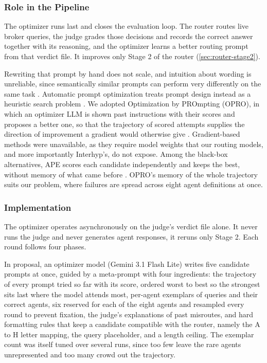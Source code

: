 \label{sec:optimizer}

\subsubsection{Role in the Pipeline}\label{sec:optimizer-role}

The optimizer runs last and closes the evaluation loop. The router routes live broker queries, the judge grades those decisions and records the correct answer together with its reasoning, and the optimizer learns a better routing prompt from that verdict file. It improves only Stage 2 of the router (\cref{sec:router-stage2}).

Rewriting that prompt by hand does not scale, and intuition about wording is unreliable, since semantically similar prompts can perform very differently on the same task \autocite{yang2023llmoptimizers}. Automatic prompt optimization treats prompt design instead as a heuristic search problem \autocite{cui2025aposurvey,ramnath2025aposurvey}. We adopted Optimization by PROmpting (OPRO), in which an optimizer LLM is shown past instructions with their scores and proposes a better one, so that the trajectory of scored attempts supplies the direction of improvement a gradient would otherwise give \autocite{yang2023llmoptimizers}. Gradient-based methods were unavailable, as they require model weights that our routing models, and more importantly Interhyp's, do not expose. Among the black-box alternatives, APE scores each candidate independently and keeps the best, without memory of what came before \autocite{zhou2023ape}. OPRO's memory of the whole trajectory suits our problem, where failures are spread across eight agent definitions at once.

\subsubsection{Implementation}\label{sec:optimizer-implementation}

The optimizer operates asynchronously on the judge's verdict file alone. It never runs the judge and never generates agent responses, it reruns only Stage 2. Each round follows four phases.

In proposal, an optimizer model (Gemini 3.1 Flash Lite) writes five candidate prompts at once, guided by a meta-prompt with four ingredients: the trajectory of every prompt tried so far with its score, ordered worst to best so the strongest sits last where the model attends most, per-agent exemplars of queries and their correct agents, six reserved for each of the eight agents and resampled every round to prevent fixation, the judge's explanations of past misroutes, and hard formatting rules that keep a candidate compatible with the router, namely the A to H letter mapping, the query placeholder, and a length ceiling. The exemplar count was itself tuned over several runs, since too few leave the rare agents unrepresented and too many crowd out the trajectory.

